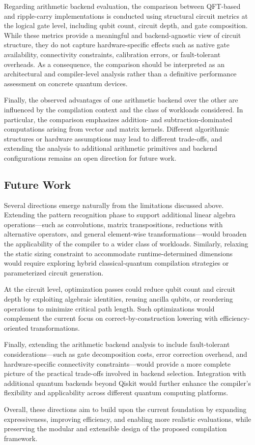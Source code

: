 Regarding arithmetic backend evaluation, the comparison between QFT-based and ripple-carry implementations is conducted using structural circuit metrics at the logical gate level, including qubit count, circuit depth, and gate composition. While these metrics provide a meaningful and backend-agnostic view of circuit structure, they do not capture hardware-specific effects such as native gate availability, connectivity constraints, calibration errors, or fault-tolerant overheads. As a consequence, the comparison should be interpreted as an architectural and compiler-level analysis rather than a definitive performance assessment on concrete quantum devices.

Finally, the observed advantages of one arithmetic backend over the other are influenced by the compilation context and the class of workloads considered. In particular, the comparison emphasizes addition- and subtraction-dominated computations arising from vector and matrix kernels. Different algorithmic structures or hardware assumptions may lead to different trade-offs, and extending the analysis to additional arithmetic primitives and backend configurations remains an open direction for future work.

\subsection{Future Work}
\label{sec:future}

Several directions emerge naturally from the limitations discussed above. Extending the pattern recognition phase to support additional linear algebra operations—such as convolutions, matrix transpositions, reductions with alternative operators, and general element-wise transformations—would broaden the applicability of the compiler to a wider class of workloads. Similarly, relaxing the static sizing constraint to accommodate runtime-determined dimensions would require exploring hybrid classical-quantum compilation strategies or parameterized circuit generation.

At the circuit level, optimization passes could reduce qubit count and circuit depth by exploiting algebraic identities, reusing ancilla qubits, or reordering operations to minimize critical path length. Such optimizations would complement the current focus on correct-by-construction lowering with efficiency-oriented transformations.

Finally, extending the arithmetic backend analysis to include fault-tolerant considerations—such as gate decomposition costs, error correction overhead, and hardware-specific connectivity constraints—would provide a more complete picture of the practical trade-offs involved in backend selection. Integration with additional quantum backends beyond Qiskit would further enhance the compiler's flexibility and applicability across different quantum computing platforms.

Overall, these directions aim to build upon the current foundation by expanding expressiveness, improving efficiency, and enabling more realistic evaluations, while preserving the modular and extensible design of the proposed compilation framework.

